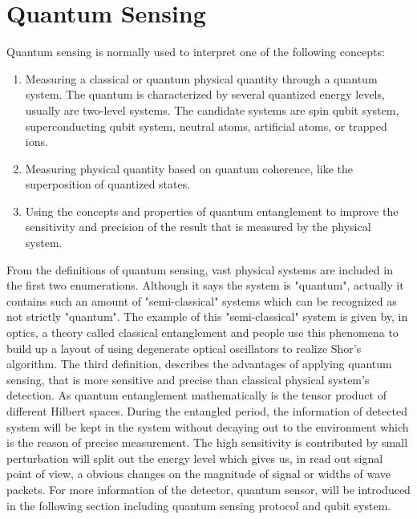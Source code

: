 \documentclass[11pt]{article}
\begin{document}
\section{Quantum Sensing}
Quantum sensing is normally used to interpret one of the following concepts\cite{degen2017quantum}:
	\begin{enumerate}
		\item Measuring a classical or quantum physical quantity through a quantum system. The quantum is characterized by several quantized energy levels, usually are two-level systems. The candidate systems are spin qubit system, superconducting qubit system, neutral atoms, artificial atoms, or trapped ions.
		\item Measuring physical quantity based on quantum coherence, like the superposition of quantized states.
		\item Using the concepts and properties of quantum entanglement to improve the sensitivity and precision of the result that is measured by the physical system.
	\end{enumerate}
From the definitions of quantum sensing, vast physical systems are included in the first two enumerations. Although it says the system is "quantum", actually it contains such an amount of "semi-classical" systems which can be recognized as not strictly "quantum". The example of this "semi-classical" system is given by, in optics, a theory called classical entanglement and people  use this phenomena to build up a layout of using degenerate optical oscillators to realize Shor's algorithm\cite{shor1994algorithms}. The third definition, describes the advantages of applying quantum sensing, that is more sensitive and precise than classical physical system's detection. As quantum entanglement mathematically is the tensor product of different Hilbert spaces. During the entangled period, the information of detected system will be kept in the system without decaying out to the environment which is the reason of precise measurement. The high sensitivity is contributed by small perturbation will split out the energy level which gives us, in read out signal point of view, a obvious changes on the magnitude of signal or widths of wave packets. For more information of the detector, quantum sensor, will be introduced in the following section including quantum sensing protocol and qubit system.
\end{document}
